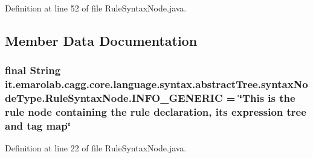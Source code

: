Definition at line 52 of file Rule\-Syntax\-Node.\-java.



\subsection{Member Data Documentation}
\hypertarget{classit_1_1emarolab_1_1cagg_1_1core_1_1language_1_1syntax_1_1abstractTree_1_1syntaxNodeType_1_1RuleSyntaxNode_a0fc88ce6cb739c64638fd94fcfe77044}{
\subsubsection[{I\-N\-F\-O\-\_\-\-G\-E\-N\-E\-R\-I\-C}]{\setlength{\rightskip}{0pt plus 5cm}final String it.\-emarolab.\-cagg.\-core.\-language.\-syntax.\-abstract\-Tree.\-syntax\-Node\-Type.\-Rule\-Syntax\-Node.\-I\-N\-F\-O\-\_\-\-G\-E\-N\-E\-R\-I\-C = \char`\"{}This is the rule node containing the rule declaration, its expression tree and tag map\char`\"{}\hspace{0.3cm}{\ttfamily [static]}}}\label{classit_1_1emarolab_1_1cagg_1_1core_1_1language_1_1syntax_1_1abstractTree_1_1syntaxNodeType_1_1RuleSyntaxNode_a0fc88ce6cb739c64638fd94fcfe77044}


Definition at line 22 of file Rule\-Syntax\-Node.\-java.

